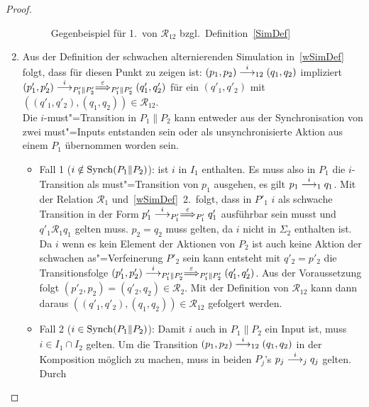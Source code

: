 \begin{proof}
\begin{enumerate}
\begin{figure}[htbp]
\begin{center}
        \caption{Gegenbeispiel für 1.\ von $\mathcal{R}_{12}$ bzgl.\
        Definition~\ref{SimDef}}
        \label{bsp1wSim}
      \end{center}
    \end{figure}

    \item Aus der Definition der schwachen alternierenden
      Simulation in~\ref{wSimDef} folgt, dass für diesen Punkt zu zeigen ist:
      $(p_1,p_2)\must[i]_{12}(q_1,q_2)$ impliziert $(p'_1,p'_2)
      \must[i]_{P'_1\|P'_2} \weakmust[\varepsilon]_{P'_1\|P'_2} (q'_1,q'_2)$
      für ein $(q'_1,q'_2)$ mit $((q'_1,q'_2),(q_1,q_2)) \in
      \mathcal{R}_{12}$.\\
      Die $i$-must"=Transition in $P_1\|P_2$ kann entweder aus der
      Synchronisation von zwei must"=Inputs entstanden sein oder als
      unsynchronisierte Aktion aus einem $P_1$ übernommen worden sein.
      \begin{itemize}
        \item Fall 1 ($i\notin\mathrm{Synch} (P_1\|P_2)$): \OBdA{} ist $i$ in $I_1$
          enthalten. Es muss also in $P_1$ die $i$-Transition als
          must"=Transition von $p_1$ ausgehen, es gilt $p_1\must[i]_1 q_1$. Mit
          der Relation $\mathcal{R}_1$ und~\ref{wSimDef}~2.\ folgt, dass in
          $P'_1$ $i$ als schwache Transition in der Form $p'_1\must[i]_{P'_1}
          \weakmust[\varepsilon]_{P'_1}q'_1$ ausführbar sein musst und $q'_1
          \mathcal{R}_1q_1$ gelten muss. $p_2=q_2$ muss gelten, da $i$ nicht in
          $\Sigma _2$ enthalten ist. Da $i$ wenn es kein Element der Aktionen
          von $P_2$ ist auch keine Aktion der schwachen as"=Verfeinerung $P'_2$
          sein kann entsteht mit $q'_2=p'_2$ die Transitionsfolge $(p'_1,p'_2)
          \must[i]_{P'_1\|P'_2} \weakmust[\varepsilon]_{P'_1\|P'_2}
          (q'_1,q'_2)$. Aus der Voraussetzung folgt $(p'_2,p_2) = (q'_2,q_2)
          \in \mathcal{R}_2$. Mit der Definition von $\mathcal{R}_{12}$ kann
          dann daraus $((q'_1,q'_2),(q_1,q_2)) \in \mathcal{R}_{12}$ gefolgert
          werden.
        \item Fall 2 ($i\in\mathrm{Synch} (P_1\|P_2)$): Damit $i$ auch in $P_1\|P_2$
          ein Input ist, muss $i\in I_1\cap I_2$ gelten. Um die Transition
          $(p_1,p_2)\must[i]_{12}(q_1,q_2)$ in der Komposition möglich zu
          machen, muss in beiden $P_j$'s $p_j\must[i]_j q_j$ gelten. Durch

\end{itemize}
\end{enumerate}
\end{proof}
